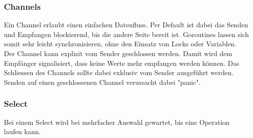 \documentclass[12pt,titlepage]{article}
\begin{document}
\subsubsection{Channels}
Ein Channel erlaubt einen einfachen Datenfluss. Per Default ist dabei das Senden und Empfangen blockierend, bis die andere Seite bereit ist. Goroutines lassen sich somit sehr leicht synchronisieren, ohne den Einsatz von Locks oder Variablen. Der Channel kann explizit vom Sender geschlossen werden. Damit wird dem Empfänger signalisiert, dass keine Werte mehr empfangen werden können. Das Schliessen des Channels sollte dabei exklusiv vom Sender ausgeführt werden. Senden auf einen geschlossenen Channel verursacht dabei "panic".

\subsubsection{Select}
Bei einem Select wird bei mehrfacher Auswahl gewartet, bis eine Operation laufen kann. 
\end{document}
